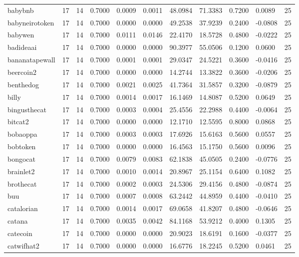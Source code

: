 \begin{table}[htbp]
\begin{tabular}{lllllllllll}
babybnb & 17 & 14 & 0.7000 & 0.0009 & 0.0011 & 48.0984 & 71.3383 & 0.7200 & 0.0089 & 25 \\
babyneirotoken & 17 & 14 & 0.7000 & 0.0000 & 0.0000 & 49.2538 & 37.9239 & 0.2400 & -0.0808 & 25 \\
babywen & 17 & 14 & 0.7000 & 0.0111 & 0.0146 & 22.4170 & 18.5728 & 0.4800 & -0.0222 & 25 \\
badideaai & 17 & 14 & 0.7000 & 0.0000 & 0.0000 & 90.3977 & 55.0506 & 0.1200 & 0.0600 & 25 \\
bananatapewall & 17 & 14 & 0.7000 & 0.0001 & 0.0001 & 29.0347 & 24.5221 & 0.3600 & -0.0416 & 25 \\
beercoin2 & 17 & 14 & 0.7000 & 0.0000 & 0.0000 & 14.2744 & 13.3822 & 0.3600 & -0.0206 & 25 \\
benthedog & 17 & 14 & 0.7000 & 0.0021 & 0.0025 & 41.7364 & 31.5857 & 0.3200 & -0.0879 & 25 \\
billy & 17 & 14 & 0.7000 & 0.0014 & 0.0017 & 16.1469 & 14.8087 & 0.5200 & 0.0649 & 25 \\
bingusthecat & 17 & 14 & 0.7000 & 0.0003 & 0.0004 & 25.4556 & 22.2988 & 0.4400 & -0.0064 & 25 \\
bitcat2 & 17 & 14 & 0.7000 & 0.0000 & 0.0000 & 12.1710 & 12.5595 & 0.8000 & 0.0868 & 25 \\
bobaoppa & 17 & 14 & 0.7000 & 0.0003 & 0.0003 & 17.6926 & 15.6163 & 0.5600 & 0.0557 & 25 \\
bobtoken & 17 & 14 & 0.7000 & 0.0000 & 0.0000 & 16.4563 & 15.1750 & 0.5600 & 0.0096 & 25 \\
bongocat & 17 & 14 & 0.7000 & 0.0079 & 0.0083 & 62.1838 & 45.0505 & 0.2400 & -0.0776 & 25 \\
brainlet2 & 17 & 14 & 0.7000 & 0.0010 & 0.0014 & 20.8967 & 25.1154 & 0.6400 & 0.1082 & 25 \\
brothecat & 17 & 14 & 0.7000 & 0.0002 & 0.0003 & 24.5306 & 29.4156 & 0.4800 & -0.0874 & 25 \\
buu & 17 & 14 & 0.7000 & 0.0007 & 0.0008 & 63.2442 & 44.8959 & 0.4400 & -0.0410 & 25 \\
catalorian & 17 & 14 & 0.7000 & 0.0014 & 0.0017 & 69.0658 & 41.8207 & 0.4800 & -0.0646 & 25 \\
catana & 17 & 14 & 0.7000 & 0.0035 & 0.0042 & 84.1168 & 53.9212 & 0.4000 & 0.1305 & 25 \\
catecoin & 17 & 14 & 0.7000 & 0.0000 & 0.0000 & 20.9023 & 18.6191 & 0.1600 & -0.0377 & 25 \\
catwifhat2 & 17 & 14 & 0.7000 & 0.0000 & 0.0000 & 16.6776 & 18.2245 & 0.5200 & 0.0461 & 25 \\

\end{tabular}
\end{table}
